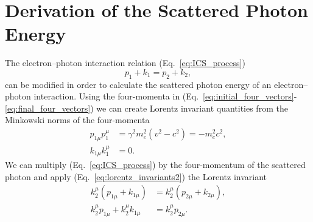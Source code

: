 \documentclass[../main.tex]{subfiles}
\begin{document}
\section{Derivation of the Scattered Photon Energy}
\label{sec:derivation_of_the_scattered_photon_energy}

The electron--photon interaction relation (Eq.~\ref{eq:ICS_process})
\begin{equation*}
p_{1} + k_{1} = p_{2} + k_{2},    
\end{equation*}
can be modified in order to calculate the scattered photon energy of an electron--photon interaction. Using the four-momenta in (Eq.~\ref{eq:initial_four_vectors}-\ref{eq:final_four_vectors}) we can create Lorentz invariant quantities from the Minkowski norms of the four-momenta 
\begin{align}
p_{1\mu}p_{1}^{\mu} &= \gamma^{2}m_{e}^{2}\left(v^{2}-c^{2}\right) = -m_{e}^{2}c^{2},
\label{eq:lorentz_invariants1} \\
k_{1\mu}k_{1}^{\mu} &= 0.
\label{eq:lorentz_invariants2}
\end{align}
We can multiply (Eq.~\ref{eq:ICS_process}) by the four-momentum  of the scattered photon and apply (Eq.~\ref{eq:lorentz_invariants2}) the Lorentz invariant 
\begin{align}
k_{2}^{\mu}\left(p_{1\mu} + k_{1\mu}\right) &= k_{2}^{\mu}\left(p_{2\mu} + k_{2\mu}\right), \nonumber\\
k_{2}^{\mu}p_{1\mu}+k_{2}^{\mu}k_{1\mu} &= k_{2}^{\mu}p_{2\mu}.
\label{eq:apply_photon_pfinal}
\end{align}
\end{document}
